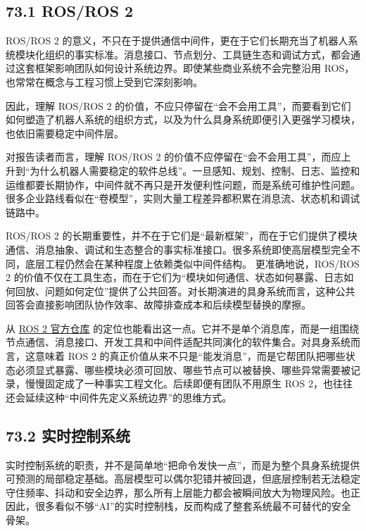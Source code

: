 \subsection*{73.1 ROS/ROS 2}


ROS/ROS 2 的意义，不只在于提供通信中间件，更在于它们长期充当了机器人系统模块化组织的事实标准。消息接口、节点划分、工具链生态和调试方式，都会通过这套框架影响团队如何设计系统边界。即使某些商业系统不会完整沿用 ROS，也常常在概念与工程习惯上受到它深刻影响。

因此，理解 ROS/ROS 2 的价值，不应只停留在“会不会用工具”，而要看到它们如何塑造了机器人系统的组织方式，以及为什么具身系统即便引入更强学习模块，也依旧需要稳定中间件层。

对报告读者而言，理解 ROS/ROS 2 的价值不应停留在“会不会用工具”，而应上升到“为什么机器人需要稳定的软件总线”。一旦感知、规划、控制、日志、监控和运维都要长期协作，中间件就不再只是开发便利性问题，而是系统可维护性问题。很多企业路线看似在“卷模型”，实则大量工程差异都积累在消息流、状态机和调试链路中。

ROS/ROS 2 的长期重要性，并不在于它们是“最新框架”，而在于它们提供了模块通信、消息抽象、调试和生态整合的事实标准接口。很多系统即使高层模型完全不同，底层工程仍然会在某种程度上依赖类似中间件结构。 更准确地说，ROS/ROS 2 的价值不仅在工具生态，而在于它们为“模块如何通信、状态如何暴露、日志如何回放、问题如何定位”提供了公共回答。对长期演进的具身系统而言，这种公共回答会直接影响团队协作效率、故障排查成本和后续模型替换的摩擦。

从 \href{https://github.com/ros2/ros2}{ROS 2 官方仓库} 的定位也能看出这一点。它并不是单个消息库，而是一组围绕节点通信、消息接口、开发工具和中间件适配共同演化的软件集合。对具身系统而言，这意味着 ROS 2 的真正价值从来不只是“能发消息”，而是它帮团队把哪些状态必须显式暴露、哪些模块必须可回放、哪些节点可以被替换、哪些异常需要被记录，慢慢固定成了一种事实工程文化。后续即便有团队不用原生 ROS 2，也往往还会延续这种“中间件先定义系统边界”的思维方式。

\subsection*{73.2 实时控制系统}


实时控制系统的职责，并不是简单地“把命令发快一点”，而是为整个具身系统提供可预测的局部稳定基础。高层模型可以偶尔犯错并被回退，但底层控制若无法稳定守住频率、抖动和安全边界，那么所有上层能力都会被瞬间放大为物理风险。也正因此，很多看似不够“AI”的实时控制栈，反而构成了整套系统最不可替代的安全骨架。

